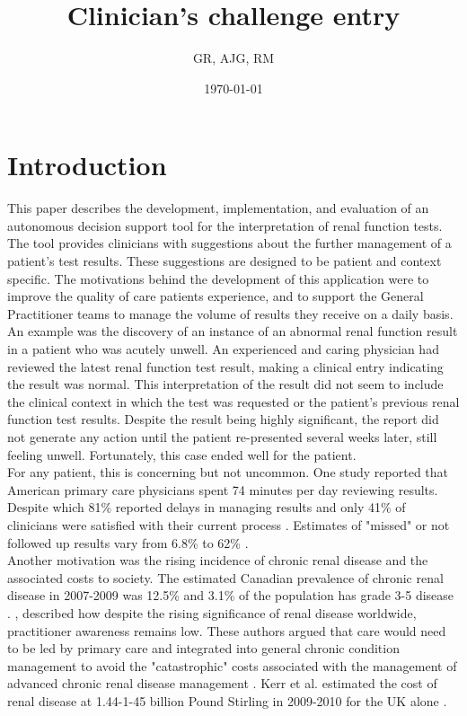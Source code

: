 \documentclass[11pt,a4paper]{article}
\title{\textbf{Clinician's challenge entry}}
\author{GR, AJG, RM}
\date{\today}
\begin{document}
\maketitle

\section{Introduction}

This paper describes the development, implementation, and evaluation  of an autonomous decision support tool for the interpretation of renal function tests. The tool provides clinicians with suggestions about the further management of a patient's test results. These suggestions are designed to be patient and context specific. The motivations behind the development of this application were to improve the quality of care patients experience, and to support the General Practitioner teams to manage the volume of results they receive on a daily basis. \\

An example was the discovery of an instance of an abnormal renal function result in a patient who was acutely unwell. An experienced and caring physician had reviewed the latest renal function test result, making a clinical entry indicating the result was normal. This interpretation of the result did not seem to include the clinical context in which the test was requested or the patient's previous renal function test results. Despite the result being highly significant, the report did not generate any action until the patient re-presented several weeks later, still feeling unwell. Fortunately, this case ended well for the patient.\\

For any patient, this is concerning but not uncommon. One study reported that American primary care physicians spent 74 minutes per day reviewing results. Despite which 81\% reported delays in managing results and only 41\% of clinicians were satisfied with their current process \citep{poon2004wish}. Estimates of "missed" or not followed up results vary from 6.8\% to 62\% \citep{callen2012failure}.\\

Another motivation was the rising incidence of chronic renal disease and the associated costs to society. The estimated Canadian prevalence of chronic renal disease in 2007-2009 was 12.5\% and 3.1\% of the population has grade 3-5 disease \citep{arora2013prevalence}. \citep{anachronistic}, described how despite the rising significance of renal disease worldwide, practitioner awareness remains low. These authors argued that care would need to be led by primary care and integrated into general chronic condition management to avoid the "catastrophic" costs associated with the management of advanced chronic renal disease management \citep{jha2013chronic}. Kerr et al. estimated the cost of renal disease at 1.44-1-45 billion Pound Stirling in 2009-2010 for the UK alone \citep{underestimating}.\\
\end{document}
